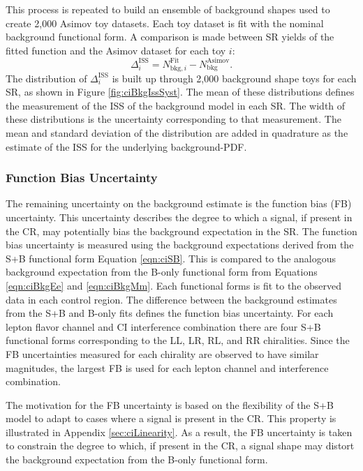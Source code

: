 This process is repeated to build an ensemble of background shapes used to create 2,000 Asimov toy datasets.
Each toy dataset is fit with the nominal background functional form.
A comparison is made between SR yields of the fitted function and the Asimov dataset for each toy $i$:
\begin{equation*}
    \Delta_i^\text{ISS}=N_{\text{bkg},i}^\text{Fit}-N_\text{bkg}^\text{Asimov}.
\end{equation*}
The distribution of $\Delta_i^\text{ISS}$ is built up through 2,000 background shape toys for each SR, as shown in Figure \ref{fig:ciBkgIssSyst}.
The mean of these distributions defines the measurement of the ISS of the background model in each SR.
The width of these distributions is the uncertainty corresponding to that measurement.
The mean and standard deviation of the distribution are added in quadrature as the estimate of the ISS for the underlying background-PDF.

\subsubsection{Function Bias Uncertainty}

The remaining uncertainty on the background estimate is the function bias (FB) uncertainty.
This uncertainty describes the degree to which a signal, if present in the CR, may potentially bias the background expectation in the SR.
The function bias uncertainty is measured using the background expectations derived from the S+B functional form Equation \ref{eqn:ciSB}.
This is compared to the analogous background expectation from the B-only functional form from Equations \ref{eqn:ciBkgEe} and \ref{eqn:ciBkgMm}.
Each functional forms is fit to the observed data in each control region.
The difference between the background estimates from the S+B and B-only fits defines the function bias uncertainty.
For each lepton flavor channel and CI interference combination there are four S+B functional forms corresponding to the LL, LR, RL, and RR chiralities.
Since the FB uncertainties measured for each chirality are observed to have similar magnitudes, the largest FB is used for each lepton channel and interference combination.

The motivation for the FB uncertainty is based on the flexibility of the S+B model to adapt to cases where a signal is present in the CR.
This property is illustrated in Appendix \ref{sec:ciLinearity}.
As a result, the FB uncertainty is taken to constrain the degree to which, if present in the CR, a signal shape may distort the background expectation from the B-only functional form.

